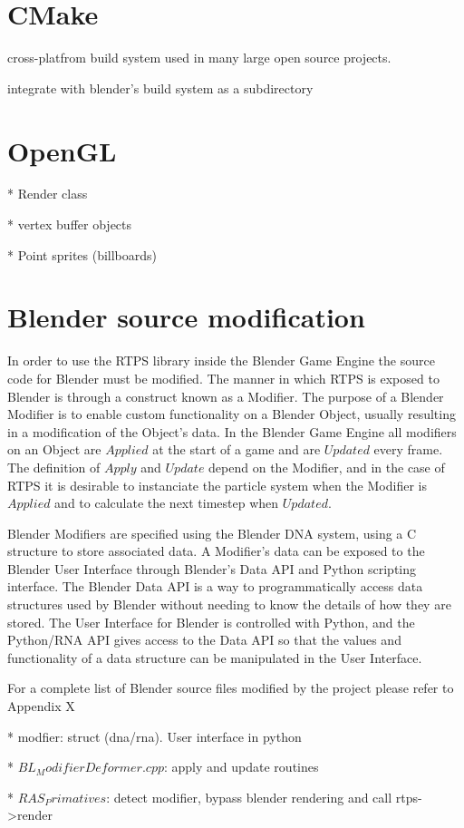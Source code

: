 \section{CMake}
cross-platfrom build system used in many large open source projects.


integrate with blender's build system as a subdirectory


\section{OpenGL}
* Render class


* vertex buffer objects


* Point sprites (billboards)




\section{Blender source modification}

In order to use the RTPS library inside the Blender Game Engine the source code
for Blender must be modified. The manner in which RTPS is exposed to Blender is
through a construct known as a Modifier. The purpose of a Blender Modifier is
to enable custom functionality on a Blender Object, usually resulting in a
modification of the Object's data. In the Blender Game Engine all modifiers on an Object are
$Applied$ at the start of a game and are $Updated$ every frame. The definition
of $Apply$ and $Update$ depend on the Modifier, and in the case of RTPS it is
desirable to instanciate the particle system when the Modifier is $Applied$ and
to calculate the next timestep when $Updated$.


Blender Modifiers are specified using the Blender DNA system, using a C
structure to store associated data. A Modifier's data can be exposed to the Blender User Interface
through Blender's Data API and Python scripting interface. The Blender Data API
is a way to programmatically access data structures used by Blender without
needing to know the details of how they are stored.\cite{b3dDataAPI} The User
Interface for Blender is controlled with Python, and the Python/RNA API gives
access to the Data API so that the values and functionality of a data structure
can be manipulated in the User Interface.



For a complete list of Blender source files modified by the project please refer to Appendix X

* modfier: struct (dna/rna). User interface in python


* $BL_ModifierDeformer.cpp$: apply and update routines


* $RAS_Primatives$: detect modifier, bypass blender rendering and call rtps->render



